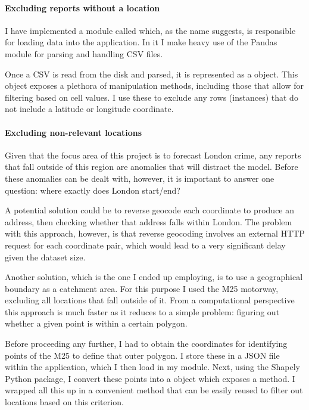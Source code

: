 \documentclass{article}
\begin{document}
	\paragraph{Excluding reports without a location}

	I have implemented a module called  which, as the name suggests, is responsible for loading data into the application. In it I make heavy use of the Pandas module for parsing and handling CSV files.

	Once a CSV is read from the disk and parsed, it is represented as a  object. This object exposes a plethora of manipulation methods, including those that allow for filtering based on cell values. I use these to exclude any rows (instances) that do not include a latitude or longitude coordinate.

	\paragraph{Excluding non-relevant locations}

	Given that the focus area of this project is to forecast London crime, any reports that fall outside of this region are anomalies that will distract the model. Before these anomalies can be dealt with, however, it is important to answer one question: where exactly does London start/end?

	A potential solution could be to reverse geocode each coordinate to produce an address, then checking whether that address falls within London. The problem with this approach, however, is that reverse geocoding involves an external HTTP request for each coordinate pair, which would lead to a very significant delay given the dataset size.

	Another solution, which is the one I ended up employing, is to use a geographical boundary as a catchment area. For this purpose I used the M25 motorway, excluding all locations that fall outside of it. From a computational perspective this approach is much faster as it reduces to a simple problem: figuring out whether a given point is within a certain polygon.

	Before proceeding any further, I had to obtain the coordinates for identifying points of the M25 to define that outer polygon. I store these in a JSON file within the application, which I then load in my  module. Next, using the Shapely Python package, I convert these points into a  object which exposes a  method. I wrapped all this up in a convenient  method that can be easily reused to filter out locations based on this criterion.
\end{document}
